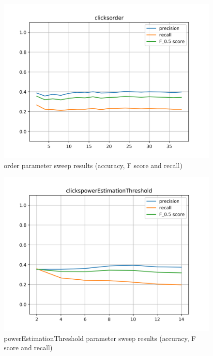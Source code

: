 \begin{figure}[!ht]
	\includegraphics[clip,width=\columnwidth]{Figures/clicksorder.png}%
	\caption{order parameter sweep results (accuracy, F score and recall)}
	\label{fig:clicksorder}
\end{figure}

\begin{figure}[!ht]
	\includegraphics[clip,width=\columnwidth]{Figures/clickspowerEstimationThreshold.png}%
	\caption{powerEstimationThreshold parameter sweep results (accuracy, F score and recall)}
	\label{fig:clickspowerEstimationThreshold}
\end{figure}

